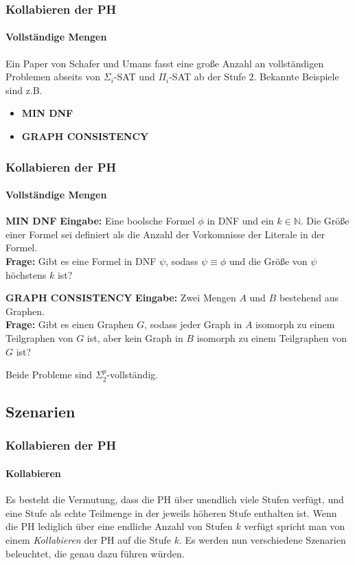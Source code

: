 \begin{frame}
    \frametitle{Kollabieren der PH}
    \framesubtitle{Vollständige Mengen}
    Ein Paper von Schafer und Umans fasst eine große Anzahl an vollständigen Problemen abseits von $\Sigma_i$-SAT und $\Pi_i$-SAT ab der Stufe $2$.
    Bekannte Beispiele sind z.B.
    \begin{itemize}
        \item \textbf{MIN DNF}
        \item \textbf{GRAPH CONSISTENCY}
    \end{itemize}
\end{frame}

\begin{frame}
    \frametitle{Kollabieren der PH}
    \framesubtitle{Vollständige Mengen}
     \begin{block}{\textbf{MIN DNF}}
        \textbf{Eingabe:} Eine boolsche Formel $\phi$ in DNF und ein $k \in \mathbb{N}$. Die Größe einer Formel sei definiert als die Anzahl der Vorkomnisse der Literale in der Formel.\\ 
        \textbf{Frage:} Gibt es eine Formel in DNF $\psi$, sodass $\psi \equiv \phi$ und die Größe von $\psi$ höchstens $k$ ist?
    \end{block}
    
    \begin{block}{\textbf{GRAPH CONSISTENCY}}
        \textbf{Eingabe:} Zwei Mengen $A$ und $B$ bestehend aus Graphen.\\ 
        \textbf{Frage:} Gibt es einen Graphen $G$, sodass jeder Graph in $A$ isomorph zu einem Teilgraphen von $G$ ist, aber kein Graph in $B$ isomorph zu einem Teilgraphen von $G$ ist?
    \end{block}
    Beide Probleme sind $\Sigma^p_2$-vollständig.
\end{frame}

\subsection{Szenarien}
\begin{frame}
    \frametitle{Kollabieren der PH}
    \framesubtitle{Kollabieren}
    Es besteht die Vermutung, dass die PH über unendlich viele Stufen verfügt, und eine Stufe als echte Teilmenge in der jeweils höheren Stufe enthalten ist. 
    Wenn die PH lediglich über eine endliche Anzahl von Stufen $k$ verfügt spricht man von einem \emph{Kollabieren} der PH auf die Stufe $k$.
    Es werden nun verschiedene Szenarien beleuchtet, die genau dazu führen würden.
\end{frame}

